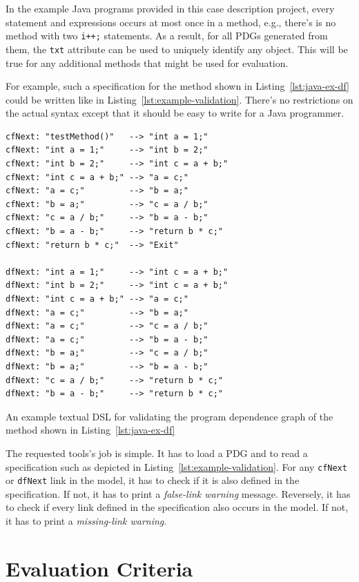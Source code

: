 \documentclass[11pt]{article}
\begin{document}
In the example Java programs provided in this case description project, every
statement and expressions occurs at most once in a method, e.g., there's is no
method with two \verb|i++;| statements.  As a result, for all PDGs generated
from them, the \verb|txt| attribute can be used to uniquely identify any
object.  This will be true for any additional methods that might be used for
evaluation.

For example, such a specification for the method shown in
Listing~\ref{lst:java-ex-df} could be written like in
Listing~\ref{lst:example-validation}.  There's no restrictions on the actual
syntax except that it should be easy to write for a Java programmer.

\begin{listing}
\begin{verbatim}
cfNext: "testMethod()"   --> "int a = 1;"
cfNext: "int a = 1;"     --> "int b = 2;"
cfNext: "int b = 2;"     --> "int c = a + b;"
cfNext: "int c = a + b;" --> "a = c;"
cfNext: "a = c;"         --> "b = a;"
cfNext: "b = a;"         --> "c = a / b;"
cfNext: "c = a / b;"     --> "b = a - b;"
cfNext: "b = a - b;"     --> "return b * c;"
cfNext: "return b * c;"  --> "Exit"

dfNext: "int a = 1;"     --> "int c = a + b;"
dfNext: "int b = 2;"     --> "int c = a + b;"
dfNext: "int c = a + b;" --> "a = c;"
dfNext: "a = c;"         --> "b = a;"
dfNext: "a = c;"         --> "c = a / b;"
dfNext: "a = c;"         --> "b = a - b;"
dfNext: "b = a;"         --> "c = a / b;"
dfNext: "b = a;"         --> "b = a - b;"
dfNext: "c = a / b;"     --> "return b * c;"
dfNext: "b = a - b;"     --> "return b * c;"
\end{verbatim}
  \caption{An example textual DSL for validating the program dependence graph
    of the method shown in Listing~\ref{lst:java-ex-df}}
  \label{lst:example-validation}
\end{listing}

The requested tools's job is simple.  It has to load a PDG and to read a
specification such as depicted in Listing~\ref{lst:example-validation}.  For
any \verb|cfNext| or \verb|dfNext| link in the model, it has to check if it is
also defined in the specification.  If not, it has to print a \emph{false-link
  warning} message.  Reversely, it has to check if every link defined in the
specification also occurs in the model.  If not, it has to print a
\emph{missing-link warning}.



\section{Evaluation Criteria}
\label{sec:evaluation-criteria}
\end{document}
